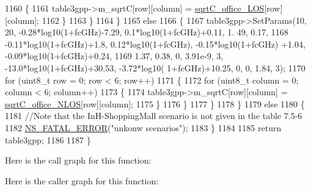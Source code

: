 \begin{DoxyCode}
1160                                 \{
1161                                         table3gpp->m\_sqrtC[row][column] = 
      \hyperlink{namespacens3_a39c2b4fa4d7bd533a6b2ecfa96b848ee}{sqrtC\_office\_LOS}[row][column];
1162                                 \}
1163                         \}
1164                 \}
1165                 \textcolor{keywordflow}{else}
1166                 \{
1167                         table3gpp->SetParams(10, 20, -0.28*log10(1+fcGHz)-7.29, 0.1*log10(1+fcGHz)+0.11, 1.
      49, 0.17,
1168                                         -0.11*log10(1+fcGHz)+1.8, 0.12*log10(1+fcGHz), -0.15*log10(1+fcGHz)
      +1.04, -0.09*log10(1+fcGHz)+0.24,
1169                                         1.37, 0.38, 0, 3.91e-9, 3, -13.0*log10(1+fcGHz)+30.53, -3.72*log10(
      1+fcGHz)+10.25, 0, 0, 1.84, 3);
1170                         \textcolor{keywordflow}{for} (uint8\_t row = 0; row < 6; row++)
1171                         \{
1172                                 \textcolor{keywordflow}{for} (uint8\_t column = 0; column < 6; column++)
1173                                 \{
1174                                         table3gpp->m\_sqrtC[row][column] = 
      \hyperlink{namespacens3_acc73441dd0287914f581fca4a7b36f3c}{sqrtC\_office\_NLOS}[row][column];
1175                                 \}
1176                         \}
1177                 \}
1178         \}
1179         \textcolor{keywordflow}{else}
1180         \{
1181                 \textcolor{comment}{//Note that the InH-ShoppingMall scenario is not given in the table 7.5-6}
1182                 \hyperlink{group__fatal_ga5131d5e3f75d7d4cbfd706ac456fdc85}{NS\_FATAL\_ERROR}(\textcolor{stringliteral}{"unkonw scenarios"});
1183         \}
1184 
1185         \textcolor{keywordflow}{return} table3gpp;
1186 
1187 \}
\end{DoxyCode}


Here is the call graph for this function\+:




Here is the caller graph for this function\+:


